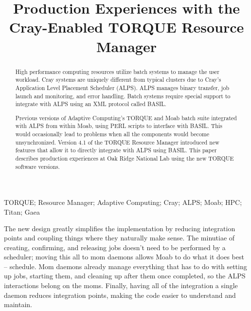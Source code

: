 \documentclass[10pt, conference, compsocconf]{IEEEtran}
\begin{document}
\title{Production Experiences with the Cray-Enabled TORQUE Resource Manager}

\author{
\and
{}
}

\maketitle


\begin{abstract}
High performance computing resources utilize batch systems to manage the user
workload. Cray systems are uniquely different from typical clusters due to
Cray’s Application Level Placement Scheduler (ALPS). ALPS manages binary
transfer, job launch and monitoring, and error handling. Batch systems require
special support to integrate with ALPS using an XML protocol called BASIL.

Previous versions of Adaptive Computing’s TORQUE and Moab batch suite integrated
with ALPS from within Moab, using PERL scripts to interface with BASIL. This
would occasionally lead to problems when all the components would become
unsynchronized. Version 4.1 of the TORQUE Resource Manager introduced new
features that allow it to directly integrate with ALPS using BASIL. This paper
describes production experiences at Oak Ridge National Lab using the new TORQUE
software versions.
\end{abstract}

\begin{IEEEkeywords}
TORQUE; Resource Manager; Adaptive Computing; Cray; ALPS; Moab; HPC; Titan; Gaea
\end{IEEEkeywords}









The new design greatly simplifies the implementation by reducing integration points and
coupling things where they naturally make sense. The minutiae of creating, confirming, and
releasing jobs doesn't need to be performed by a scheduler; moving this all to mom daemons
allows Moab to do what it does best – schedule. Mom daemons already manage everything that 
has to do with setting up jobs, starting them, and cleaning up after them once completed, 
so the ALPS interactions belong on the moms. Finally, having all of the integration a 
single daemon reduces integration points, making the code easier to understand and maintain.
\end{document}
